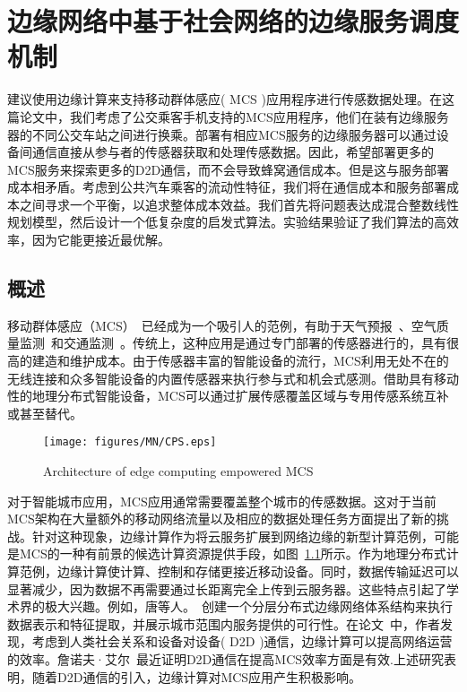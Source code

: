 \chapter{边缘网络中基于社会网络的边缘服务调度机制}

建议使用边缘计算来支持移动群体感应( MCS )应用程序进行传感数据处理。在这篇论文中，我们考虑了公交乘客手机支持的MCS应用程序，他们在装有边缘服务器的不同公交车站之间进行换乘。部署有相应MCS服务的边缘服务器可以通过设备间通信直接从参与者的传感器获取和处理传感数据。因此，希望部署更多的MCS服务来探索更多的D2D通信，而不会导致蜂窝通信成本。但是这与服务部署成本相矛盾。考虑到公共汽车乘客的流动性特征，我们将在通信成本和服务部署成本之间寻求一个平衡，以追求整体成本效益。我们首先将问题表达成混合整数线性规划模型，然后设计一个低复杂度的启发式算法。实验结果验证了我们算法的高效率，因为它能更接近最优解。


\section{概述}

移动群体感应（MCS）~\cite{ganti2011mobile,DBLP:journals/csur/GuoWYWYHZ15}已经成为一个吸引人的范例，有助于天气预报~\cite{DBLP:conf/icc/YuZZWKL10}、空气质量监测~\cite{DBLP:conf/huc/ZhangXWC14}和交通监测~\cite{DBLP:conf/icdcs/ZhouJL15}。传统上，这种应用是通过专门部署的传感器进行的，具有很高的建造和维护成本。由于传感器丰富的智能设备的流行，MCS利用无处不在的无线连接和众多智能设备的内置传感器来执行参与式和机会式感测。借助具有移动性的地理分布式智能设备，MCS可以通过扩展传感覆盖区域与专用传感系统互补或甚至替代。

\begin{figure}[!h]
\centering
\texttt{[image: figures/MN/CPS.eps]}
\vspace{-0.5em}
\caption{Architecture of edge computing empowered MCS}
\label{Figure_edge}
\end{figure}

对于智能城市应用，MCS应用通常需要覆盖整个城市的传感数据。这对于当前MCS架构在大量额外的移动网络流量以及相应的数据处理任务方面提出了新的挑战。针对这种现象，边缘计算作为将云服务扩展到网络边缘的新型计算范例，可能是MCS的一种有前景的候选计算资源提供手段，如图~\ref{Figure_edge}所示。作为地理分布式计算范例，边缘计算使计算、控制和存储更接近移动设备。同时，数据传输延迟可以显著减少，因为数据不再需要通过长距离完全上传到云服务器。这些特点引起了学术界的极大兴趣。例如，唐等人。~\cite{DBLP:journals/tii/TangCHPWHY17}创建一个分层分布式边缘网络体系结构来执行数据表示和特征提取，并展示城市范围内服务提供的可行性。在论文~\cite{DBLP:conf/wasa/Yan0WWW17}中，作者发现，考虑到人类社会关系和设备对设备( D2D )通信，边缘计算可以提高网络运营的效率。詹诺夫·艾尔~\cite{DBLP:journals/iotj/ZhanXZW18}最近证明D2D通信在提高MCS效率方面是有效.上述研究表明，随着D2D通信的引入，边缘计算对MCS应用产生积极影响。


